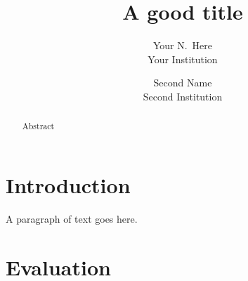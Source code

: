 \usepackage[caption=false]{subfig}



\newcommand{\todo}[1]{\textbf{TODO: #1}}
\newcommand{\ccite}[1]{~\cite{#1}}

\renewcommand{\L}{\mathcal{L}}
\renewcommand{\P}{\mathcal{P}}
\renewcommand{\O}{\mathcal{O}}
\newcommand{\R}{\mathcal{R}}
\renewcommand{\r}{\mathit{r}}
\renewcommand{\cap}{\mathit{c}}

\date{}

\title{\Large \bf A good title}

\author{
{\rm Your N.\ Here}\\
Your Institution
\and
{\rm Second Name}\\
Second Institution
} %

\maketitle

\begin{abstract}
Abstract
\end{abstract}


\section{Introduction}

A paragraph of text goes here.

\section{Evaluation}

